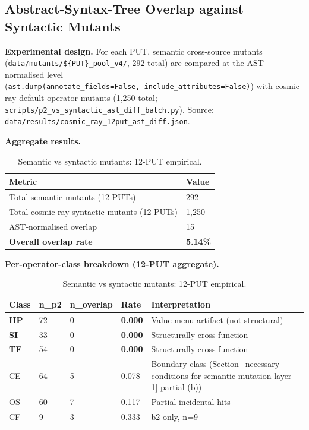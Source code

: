 \documentclass[manuscript,screen,review]{acmart}
\begin{document}
\subsection{Abstract-Syntax-Tree Overlap against Syntactic Mutants}\label{p2-vs-syntactic-mutants-12-put-empirical-layer-3}

\textbf{Experimental design.} For each PUT, semantic cross-source mutants
(\texttt{data/mutants/\$\{PUT\}\_pool\_v4/}, 292 total) are compared at
the AST-normalised level
(\texttt{ast.dump(annotate\_fields=False,\ include\_attributes=False)})
with cosmic-ray default-operator mutants (1,250 total;
\texttt{scripts/p2\_vs\_syntactic\_ast\_diff\_batch.py}). Source:
\texttt{data/results/cosmic\_ray\_12put\_ast\_diff.json}.

\textbf{Aggregate results.}

{%
\begin{longtable}[]{@{}ll@{}}
\caption{Semantic vs syntactic mutants: 12-PUT empirical.}\label{tab:p2-04}\\
\toprule\noalign{}
Metric & Value \\
\midrule\noalign{}
\endfirsthead
\endhead
\bottomrule\noalign{}
\endlastfoot
Total semantic mutants (12 PUTs) & 292 \\
Total cosmic-ray syntactic mutants (12 PUTs) & 1,250 \\
AST-normalised overlap & 15 \\
\textbf{Overall overlap rate} & \textbf{5.14\%} \\
\end{longtable}
}

\textbf{Per-operator-class breakdown (12-PUT aggregate).}

{%
\begin{longtable}[]{@{}lllll@{}}
\caption{Semantic vs syntactic mutants: 12-PUT empirical.}\label{tab:p2-05}\\
\toprule\noalign{}
Class & n\_p2 & n\_overlap & Rate & Interpretation \\
\midrule\noalign{}
\endfirsthead
\endhead
\bottomrule\noalign{}
\endlastfoot
\textbf{HP} & 72 & 0 & \textbf{0.000} & Value-menu artifact (not structural) \\
\textbf{SI} & 33 & 0 & \textbf{0.000} & Structurally cross-function \\
\textbf{TF} & 54 & 0 & \textbf{0.000} & Structurally cross-function \\
CE & 64 & 5 & 0.078 & Boundary class (Section~\ref{necessary-conditions-for-semantic-mutation-layer-1} partial (b)) \\
OS & 60 & 7 & 0.117 & Partial incidental hits \\
CF & 9 & 3 & 0.333 & b2 only, n=9 \\
\end{longtable}
}
\end{document}
